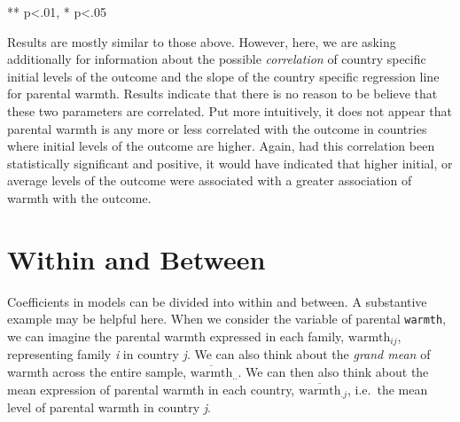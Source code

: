 \documentclass[
  letterpaper,
  DIV=11,
  numbers=noendperiod]{scrreprt}
\begin{document}
** p\textless.01, * p\textless.05

Results are mostly similar to those above. However, here, we are asking
additionally for information about the possible \emph{correlation} of
country specific initial levels of the outcome and the slope of the
country specific regression line for parental warmth. Results indicate
that there is no reason to be believe that these two parameters are
correlated. Put more intuitively, it does not appear that parental
warmth is any more or less correlated with the outcome in countries
where initial levels of the outcome are higher. Again, had this
correlation been statistically significant and positive, it would have
indicated that higher initial, or average levels of the outcome were
associated with a greater association of warmth with the outcome.

\section{Within and Between}\label{sec-withinbetween}

Coefficients in models can be divided into within and between. A
substantive example may be helpful here. When we consider the variable
of parental \texttt{warmth}, we can imagine the parental warmth
expressed in each family, \(\text{warmth}_{ij}\), representing family
\emph{i} in country \emph{j}. We can also think about the \emph{grand
mean} of warmth across the entire sample,
\(\overline{\text{warmth}}_{..}\). We can then also think about the mean
expression of parental warmth in each country,
\(\overline{\text{warmth}}_{.j}\), i.e.~the mean level of parental
warmth in country \emph{j}.
\end{document}
